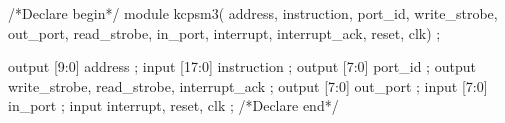 \begin{vcode}
/*Declare begin*/
module kcpsm3(
        address,
        instruction,
        port_id,
        write_strobe,
        out_port,
        read_strobe,
        in_port,
        interrupt,
        interrupt_ack,
        reset,
        clk) ;
 
output  [9:0]   address ;
input   [17:0]  instruction ;
output  [7:0]   port_id ;
output          write_strobe, read_strobe, interrupt_ack ;
output  [7:0]   out_port ;
input   [7:0]   in_port ;
input           interrupt, reset, clk ;
/*Declare end*/
\end{vcode}
